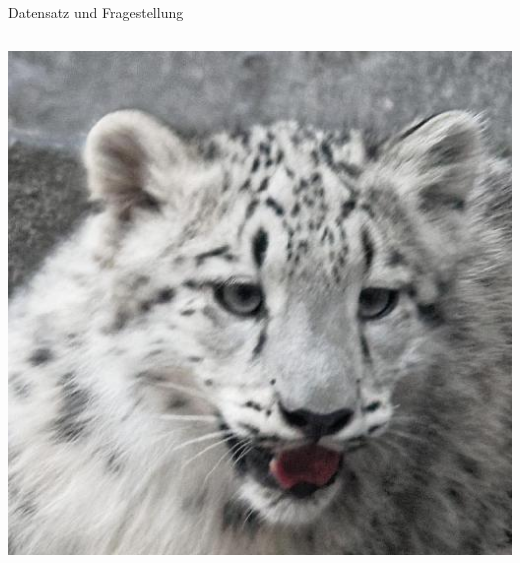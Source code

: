 \documentclass[aspectratio=1610, 9pt]{beamer}
\begin{document}
\begin{frame}{Datensatz und Fragestellung}
\begin{columns}
    \includegraphics[scale=0.13]{images/wildlife.jpg}\\

  \end{columns}
\end{frame}
\end{document}

